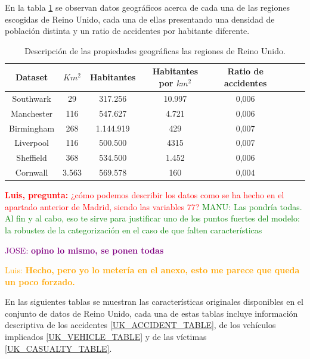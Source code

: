 \documentclass{uathesis-es}
\begin{document}
{%

En la tabla \ref{UK_statistics} se observan datos geográficos acerca de cada una de las regiones escogidas de Reino Unido, cada una de ellas presentando una densidad de población distinta y un ratio de accidentes por habitante diferente.

\begin{table}[ht]
    \begin{center}
        \begin{tabular}{|c|c||c|c|c|c|c|c|}
        \hline
        \textbf{Dataset} & \textbf{$Km^2$} & \textbf{Habitantes} & \textbf{Habitantes por $km^2$} & \textbf{Ratio de accidentes}
        \\ \hline \hline
        Southwark   &  29   &   317.256  & 10.997  & 0,006 \\ \hline
        Manchester  &  116  &   547.627  &  4.721  & 0,006 \\ \hline
        Birmingham  &  268  & 1.144.919  &    429  & 0,007 \\ \hline
        Liverpool   &  116  &   500.500  &   4315  & 0,007 \\ \hline
        Sheffield   &  368  &   534.500  &  1.452  & 0,006  \\ \hline
        Cornwall    & 3.563 &   569.578  &    160  & 0,004 \\ \hline
        \end{tabular}
    \end{center}
    \caption{Descripción de las propiedades geográficas las regiones de Reino Unido.}
    \label{UK_statistics}
\end{table}


\textcolor{red}{\textbf{Luis, pregunta:} ¿cómo podemos describir los datos como se ha hecho en el apartado anterior de Madrid, siendo las variables 77?}
\textcolor{green}{MANU: Las pondría todas. Al fin y al cabo, eso te sirve para justificar uno de los puntos fuertes del modelo: la robustez de la categorización en el caso de que falten características}

\textcolor{purple}{JOSE: \textbf{opino lo mismo, se ponen todas}}

\textcolor{orange}{Luis: \textbf{Hecho, pero yo lo metería en el anexo, esto me parece que queda un poco forzado.}}


En las siguientes tablas se muestran las características originales disponibles en el conjunto de datos de Reino Unido, cada una de estas tablas incluye información descriptiva de los accidentes \ref{UK_ACCIDENT_TABLE}, de los vehículos implicados \ref{UK_VEHICLE_TABLE} y de las víctimas \ref{UK_CASUALTY_TABLE}.

}
\end{document}
